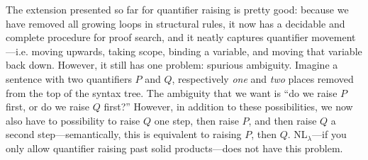 \documentclass[a4paper]{article}
\begin{document}
The extension presented so far for quantifier raising is pretty good:
because we have removed all growing loops in structural rules, it now
has a decidable and complete procedure for proof search, and it neatly
captures quantifier movement---i.e. moving upwards, taking scope,
binding a variable, and moving that variable back down. However, it
still has one problem: spurious ambiguity. Imagine a sentence with two
quantifiers $P$ and $Q$, respectively \emph{one} and \emph{two} places
removed from the top of the syntax tree. The ambiguity that we want is
``do we raise $P$ first, or do we raise $Q$ first?'' However, in
addition to these possibilities, we now also have to possibility to
raise $Q$ one step, then raise $P$, and then raise $Q$ a second
step---semantically, this is equivalent to raising $P$, then
$Q$. NL$_\lambda$---if you only allow quantifier raising past solid
products---does not have this problem.
\end{document}
